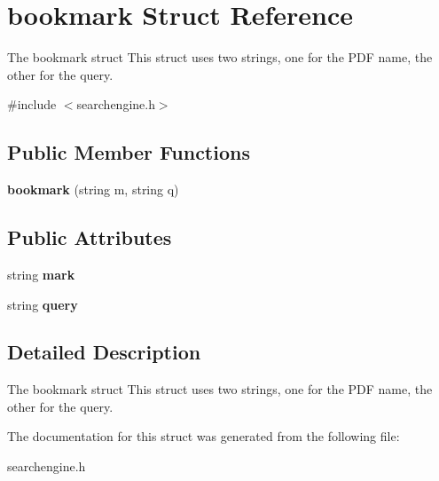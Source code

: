 \section{bookmark Struct Reference}
\label{structbookmark}


The bookmark struct This struct uses two strings, one for the P\+DF name, the other for the query.  




{\ttfamily \#include $<$searchengine.\+h$>$}

\subsection*{Public Member Functions}
\begin{DoxyCompactItemize}
\item 
{\bfseries bookmark} (string m, string q)\label{structbookmark_ad1783bc7b182c5af9e42411cac3cc08f}

\end{DoxyCompactItemize}
\subsection*{Public Attributes}
\begin{DoxyCompactItemize}
\item 
string {\bfseries mark}\label{structbookmark_a872f359ce12f82e6d906ae951840f5ac}

\item 
string {\bfseries query}\label{structbookmark_abc6d931aa6d6d2c14e906277fc5bdd77}

\end{DoxyCompactItemize}


\subsection{Detailed Description}
The bookmark struct This struct uses two strings, one for the P\+DF name, the other for the query. 

The documentation for this struct was generated from the following file\+:\begin{DoxyCompactItemize}
\item 
searchengine.\+h\end{DoxyCompactItemize}
